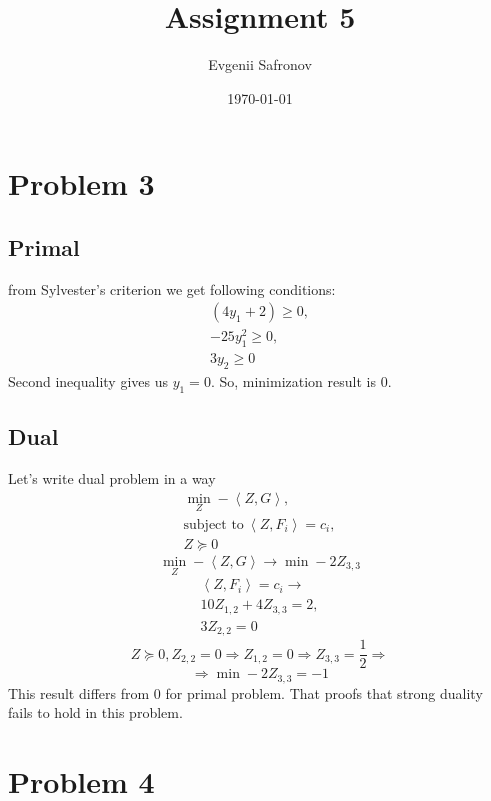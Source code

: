 \documentclass[a4paper,11pt]{scrartcl}
\title{Assignment 5}
\author{Evgenii Safronov}
\date{\today}
\begin{document}
\maketitle
\section{Problem 3}

\subsection{Primal}

from Sylvester's criterion we get following conditions:
\begin{gather*}
(4y_1 +2 ) \geq 0, \\
-25y_1^2 \geq 0, \\
3y_2 \geq 0
\end{gather*}
Second inequality gives us $y_1 = 0$. So, minimization result is $0$.
\subsection{Dual}
Let's write dual problem in a way 
\begin{gather*}
\min_Z -\left< Z, G \right>, \\
\text{subject to}~ \left<Z,F_i \right> = c_i, \\
Z \succeq 0 
\end{gather*}
$$\min_Z -\left<Z,G \right> \rightarrow \min -2 Z_{3,3} $$
\begin{gather*}
\left<Z,F_i \right> = c_i \rightarrow \\
10 Z_{1,2} + 4 Z_{3,3} = 2, \\
3 Z_{2,2} = 0
\end{gather*}
$$Z \succeq 0, Z_{2,2} = 0 \Rightarrow Z_{1,2} = 0 \Rightarrow Z_{3,3} = \frac{1}{2} \Rightarrow $$
$$ \Rightarrow \min -2 Z_{3,3} = -1 $$
This result differs from $0$ for primal problem. That proofs that strong duality fails to hold in this problem.

\section{Problem 4}
\end{document}
